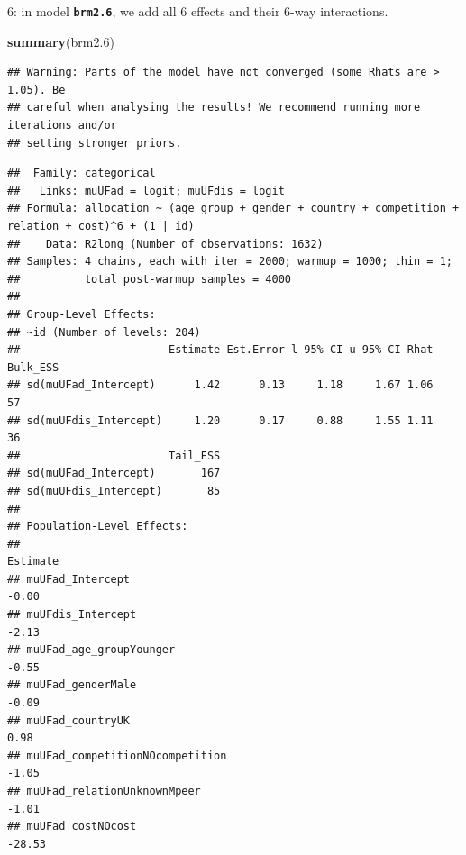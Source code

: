 \documentclass[
]{article}
\newenvironment{Shaded}{\begin{snugshade}}{\end{snugshade}}
\newcommand{\FloatTok}[1]{\textcolor[rgb]{0.00,0.00,0.81}{#1}}
\newcommand{\KeywordTok}[1]{\textcolor[rgb]{0.13,0.29,0.53}{\textbf{#1}}}
\newcommand{\NormalTok}[1]{#1}
\begin{document}
6: in model \textbf{\texttt{brm2.6}}, we add all 6 effects and their
6-way interactions.

\begin{Shaded}
\begin{Highlighting}[]
\KeywordTok{summary}\NormalTok{(brm2}\FloatTok{.6}\NormalTok{)}
\end{Highlighting}
\end{Shaded}

\begin{verbatim}
## Warning: Parts of the model have not converged (some Rhats are > 1.05). Be
## careful when analysing the results! We recommend running more iterations and/or
## setting stronger priors.
\end{verbatim}

\begin{verbatim}
##  Family: categorical 
##   Links: muUFad = logit; muUFdis = logit 
## Formula: allocation ~ (age_group + gender + country + competition + relation + cost)^6 + (1 | id) 
##    Data: R2long (Number of observations: 1632) 
## Samples: 4 chains, each with iter = 2000; warmup = 1000; thin = 1;
##          total post-warmup samples = 4000
## 
## Group-Level Effects: 
## ~id (Number of levels: 204) 
##                       Estimate Est.Error l-95% CI u-95% CI Rhat Bulk_ESS
## sd(muUFad_Intercept)      1.42      0.13     1.18     1.67 1.06       57
## sd(muUFdis_Intercept)     1.20      0.17     0.88     1.55 1.11       36
##                       Tail_ESS
## sd(muUFad_Intercept)       167
## sd(muUFdis_Intercept)       85
## 
## Population-Level Effects: 
##                                                                                                        Estimate
## muUFad_Intercept                                                                                          -0.00
## muUFdis_Intercept                                                                                         -2.13
## muUFad_age_groupYounger                                                                                   -0.55
## muUFad_genderMale                                                                                         -0.09
## muUFad_countryUK                                                                                           0.98
## muUFad_competitionNOcompetition                                                                           -1.05
## muUFad_relationUnknownMpeer                                                                               -1.01
## muUFad_costNOcost                                                                                        -28.53

\end{verbatim}
\end{document}
